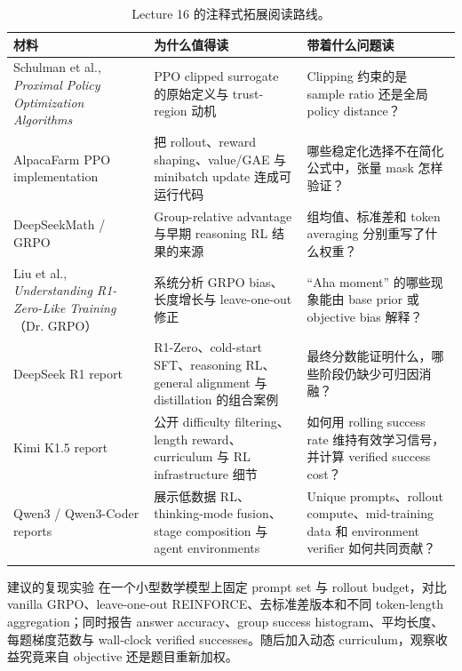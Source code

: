 \documentclass[a4paper]{article}
\begin{document}
\begin{longtable}{L{0.22\textwidth}L{0.31\textwidth}L{0.37\textwidth}}
\toprule
材料 & 为什么值得读 & 带着什么问题读 \\
\midrule
Schulman et al., \emph{Proximal Policy Optimization Algorithms} & PPO clipped surrogate 的原始定义与 trust-region 动机 & Clipping 约束的是 sample ratio 还是全局 policy distance？ \\
AlpacaFarm PPO implementation & 把 rollout、reward shaping、value/GAE 与 minibatch update 连成可运行代码 & 哪些稳定化选择不在简化公式中，张量 mask 怎样验证？ \\
DeepSeekMath / GRPO & Group-relative advantage 与早期 reasoning RL 结果的来源 & 组均值、标准差和 token averaging 分别重写了什么权重？ \\
Liu et al., \emph{Understanding R1-Zero-Like Training}（Dr. GRPO） & 系统分析 GRPO bias、长度增长与 leave-one-out 修正 & ``Aha moment'' 的哪些现象能由 base prior 或 objective bias 解释？ \\
DeepSeek R1 report & R1-Zero、cold-start SFT、reasoning RL、general alignment 与 distillation 的组合案例 & 最终分数能证明什么，哪些阶段仍缺少可归因消融？ \\
Kimi K1.5 report & 公开 difficulty filtering、length reward、curriculum 与 RL infrastructure 细节 & 如何用 rolling success rate 维持有效学习信号，并计算 verified success cost？ \\
Qwen3 / Qwen3-Coder reports & 展示低数据 RL、thinking-mode fusion、stage composition 与 agent environments & Unique prompts、rollout compute、mid-training data 和 environment verifier 如何共同贡献？ \\
\bottomrule
\caption{Lecture 16 的注释式拓展阅读路线。}
\end{longtable}

\begin{knowledgebox}{建议的复现实验}
在一个小型数学模型上固定 prompt set 与 rollout budget，对比 vanilla GRPO、leave-one-out REINFORCE、去标准差版本和不同 token-length aggregation；同时报告 answer accuracy、group success histogram、平均长度、每题梯度范数与 wall-clock verified successes。随后加入动态 curriculum，观察收益究竟来自 objective 还是题目重新加权。
\end{knowledgebox}
\end{document}
